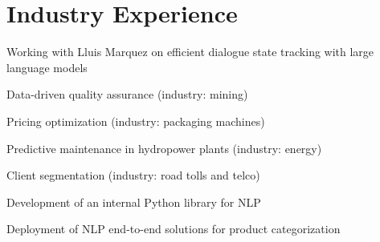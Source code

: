 \documentclass[]{deedy-resume-reversed}
\begin{document}
\begin{minipage}[t]{0.60\textwidth}

\section{Industry Experience}

\begin{tightemize}
\item Working with Lluis Marquez on efficient dialogue state tracking with large language models
\end{tightemize}
\sectionsep

\begin{tightemize}
\item Data-driven quality assurance (industry: mining)
\item Pricing optimization (industry: packaging machines)
\item Predictive maintenance in hydropower plants (industry: energy)
\item Client segmentation (industry: road tolls and telco) 
\item Development of an internal Python library for NLP
\item Deployment of NLP end-to-end solutions for product categorization
\end{tightemize}
\sectionsep



\end{minipage}
\end{document}

